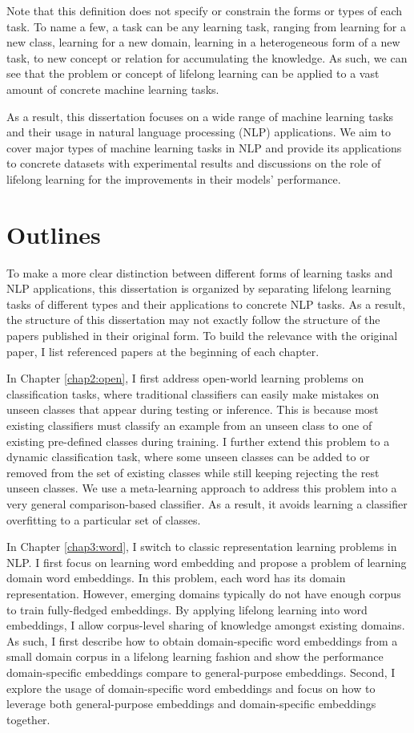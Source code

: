 Note that this definition does not specify or constrain the forms or types of each task.
To name a few, a task can be any learning task, ranging from learning for a new class, learning for a new domain, learning in a heterogeneous form of a new task, to new concept or relation for accumulating the knowledge.
As such, we can see that the problem or concept of lifelong learning can be applied to a vast amount of concrete machine learning tasks.

As a result, this dissertation focuses on a wide range of machine learning tasks and their usage in natural language processing (NLP) applications.
We aim to cover major types of machine learning tasks in NLP and provide its applications to concrete datasets with experimental results and discussions on the role of lifelong learning for the improvements in their models' performance.

\section{Outlines}
To make a more clear distinction between different forms of learning tasks and NLP applications, this dissertation is organized by separating lifelong learning tasks of different types and their applications to concrete NLP tasks. As a result, the structure of this dissertation may not exactly follow the structure of the papers published in their original form. To build the relevance with the original paper, I list referenced papers at the beginning of each chapter. 

In Chapter \ref{chap2:open}, I first address open-world learning problems on classification tasks, where traditional classifiers can easily make mistakes on unseen classes that appear during testing or inference. 
This is because most existing classifiers must classify an example from an unseen class to one of existing pre-defined classes during training. 
I further extend this problem to a dynamic classification task, where some unseen classes can be added to or removed from the set of existing classes while still keeping rejecting the rest unseen classes. We use a meta-learning approach to address this problem into a very general comparison-based classifier.
As a result, it avoids learning a classifier overfitting to a particular set of classes.

In Chapter \ref{chap3:word}, I switch to classic representation learning problems in NLP.
I first focus on learning word embedding and propose a problem of learning domain word embeddings.
In this problem, each word has its domain representation.
However, emerging domains typically do not have enough corpus to train fully-fledged embeddings.
By applying lifelong learning into word embeddings, I allow corpus-level sharing of knowledge amongst existing domains. 
As such, I first describe how to obtain domain-specific word embeddings from a small domain corpus in a lifelong learning fashion and show the performance domain-specific embeddings compare to general-purpose embeddings.
Second, I explore the usage of domain-specific word embeddings and focus on how to leverage both general-purpose embeddings and domain-specific embeddings together.

